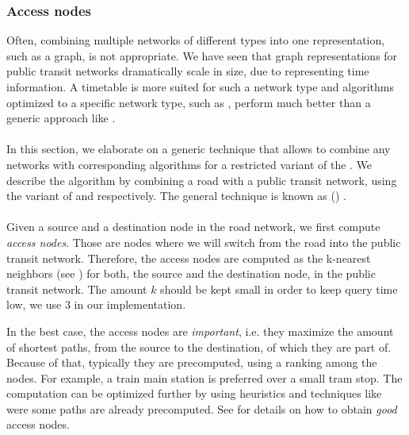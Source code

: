 \subsubsection{Access nodes}\label{accessNodes}
	Often, combining multiple networks of different types into one representation, such as a graph, is not appropriate.
	We have seen that graph representations for public transit networks dramatically scale in size, due to
	representing time information. A timetable is more suited for such a network type and algorithms optimized to a
	specific network type, such as \csa, perform much better than a generic approach like \dijkstra.\\\\
	In this section, we elaborate on a generic technique that allows to combine any networks with corresponding algorithms
	for a restricted variant of the \shortestPathProblem. We describe the algorithm by combining a road with a public transit
	network, using the \multiModal variant of \alt and \csa respectively. The general technique is known as \accessNodeRouting (\anr)
	.\\\\
	Given a source and a destination node in the road network, we first compute \textit{access nodes}.
	Those are nodes where we will switch from the road into the public transit network. Therefore, the access nodes
	are computed as the k-nearest neighbors (see ) for both, the source and the destination node,
	in the public transit network. The amount $k$ should be kept small in order to keep query time low, we use $3$ in our implementation.
	
	In the best case, the access nodes are \textit{important}, i.e. they maximize the amount of shortest paths, from the
	source to the destination, of which they are part of. Because of that, typically they are precomputed, using a ranking among the
	nodes. For example, a train main station is preferred over a small tram stop. The computation can be optimized further by using
	heuristics and techniques like \alt were some paths are already precomputed. See  for details on
	how to obtain \textit{good} access nodes.
	
